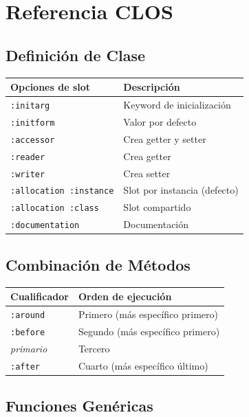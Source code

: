 \chapter{Referencia CLOS}
\label{app:clos}

\section*{Definición de Clase}

\begin{center}
\begin{tabular}{ll}
\toprule
\textbf{Opciones de slot} & \textbf{Descripción} \\
\midrule
\texttt{:initarg} & Keyword de inicialización \\
\texttt{:initform} & Valor por defecto \\
\texttt{:accessor} & Crea getter y setter \\
\texttt{:reader} & Crea getter \\
\texttt{:writer} & Crea setter \\
\texttt{:allocation :instance} & Slot por instancia (defecto) \\
\texttt{:allocation :class} & Slot compartido \\
\texttt{:documentation} & Documentación \\
\bottomrule
\end{tabular}
\end{center}

\section*{Combinación de Métodos}

\begin{center}
\begin{tabular}{ll}
\toprule
\textbf{Cualificador} & \textbf{Orden de ejecución} \\
\midrule
\texttt{:around} & Primero (más específico primero) \\
\texttt{:before} & Segundo (más específico primero) \\
\emph{primario} & Tercero \\
\texttt{:after} & Cuarto (más específico último) \\
\bottomrule
\end{tabular}
\end{center}

\section*{Funciones Genéricas}

